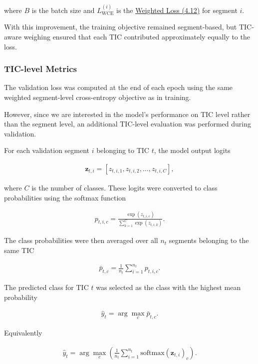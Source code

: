 where $B$ is the batch size and $L_{\mathrm{WCE}}^{(i)}$ is the \hyperref[eq:04-weighted-cross-entropy]{Weighted Loss (4.12)} for segment $i$.

\bigskip

\noindent With this improvement, the training objective remained segment-based, but TIC-aware weighing ensured that each TIC contributed approximately equally to the loss.

\subsubsection{TIC-level Metrics}

The validation loss was computed at the end of each epoch using the same weighted segment-level cross-entropy objective as in training.

However, since we are interested in the model's performance on TIC level rather than the segment level, an additional TIC-level evaluation was performed during validation.

For each validation segment $i$ belonging to TIC $t$, the model output logits

\begin{align}
    \mathbf{z}_{t,i} = [z_{t,i,1}, z_{t,i,2}, \dots, z_{t,i,C}],
\end{align}

where $C$ is the number of classes.
These logits were converted to class probabilities using the softmax function

\begin{align}
    p_{t,i,c} = \frac{\exp(z_{t,i,c})}{\sum_{k=1}^{C} \exp(z_{t,i,k})}.
\end{align}

The class probabilities were then averaged over all $n_t$ segments belonging to the same TIC

\begin{align}
    \bar{p}_{t,c} = \frac{1}{n_t} \sum_{i=1}^{n_t} p_{t,i,c}.
\end{align}

The predicted class for TIC $t$ was selected as the class with the highest mean probability

\begin{align}
    \hat{y}_t = \arg\max_{c} \bar{p}_{t,c}.
\end{align}

Equivalently

\begin{align}
    \hat{y}_t = \arg\max_c \left(\frac{1}{n_t}\sum_{i=1}^{n_t}\mathrm{softmax}(\mathbf{z}_{t,i})_c\right).
\end{align}

